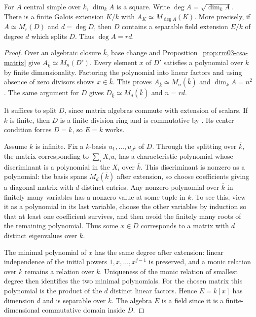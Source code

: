 \begin{theorem}
\label{thm:rm03-csa-galois-split}
For \(A\) central simple over \(k\), \(\dim_k A\) is a square.
Write \(\deg A=\sqrt{\dim_k A}\). There is a finite Galois extension
\(K/k\) with \(A_K\simeq M_{\deg A}(K)\).
More precisely, if \(A\simeq M_r(D)\) and \(d=\deg D\), then \(D\)
contains a separable field extension \(E/k\) of degree \(d\) which
splits \(D\). Thus \(\deg A=rd\).
\end{theorem}
\begin{proof}
Over an algebraic closure \(\overline{k}\), base change and
Proposition~\ref{prop:rm03-csa-matrix} give
\(A_{\overline{k}}\simeq M_n(D')\).
Every element \(x\) of \(D'\) satisfies a polynomial over
\(\overline{k}\) by finite dimensionality. Factoring the polynomial
into linear factors and using absence of zero divisors shows
\(x\in\overline{k}\). This proves \(A_{\overline{k}}\simeq
M_n(\overline{k})\) and \(\dim_k A=n^2\). The same argument for \(D\)
gives \(D_{\overline{k}}\simeq M_d(\overline{k})\) and
\(n=rd\).

It suffices to split \(D\), since matrix algebras commute with
extension of scalars. If \(k\) is finite, then \(D\) is a finite
division ring and is commutative by
\cite[K07.23.finite\_division\_ring]{d07}. Its center condition forces
\(D=k\), so \(E=k\) works.

Assume \(k\) is infinite. Fix a \(k\)-basis \(u_1,\ldots,u_{d^2}\)
of \(D\). Through the splitting over \(\overline{k}\), the matrix
corresponding to \(\sum_i X_i u_i\) has a characteristic polynomial
whose discriminant is a polynomial in the \(X_i\) over
\(\overline{k}\). This discriminant is nonzero as a polynomial:
the basis spans \(M_d(\overline{k})\) after extension, so choose
coefficients giving a diagonal matrix with \(d\) distinct entries.
Any nonzero polynomial over \(\overline{k}\) in finitely many
variables has a nonzero value at some tuple in \(k\). To see this,
view it as a polynomial in its last variable, choose the other
variables by induction so that at least one coefficient survives,
and then avoid the finitely many roots of the remaining polynomial.
Thus some \(x\in D\) corresponds to a matrix with \(d\) distinct
eigenvalues over \(\overline{k}\).

The minimal polynomial of \(x\) has the same degree after extension:
linear independence of the initial powers \(1,x,\ldots,x^{j-1}\)
is preserved, and a monic relation over \(k\) remains a relation
over \(\overline{k}\). Uniqueness of the monic relation of smallest
degree then identifies the two minimal polynomials. For the chosen
matrix this polynomial is the product of the \(d\) distinct linear
factors. Hence \(E=k[x]\) has dimension \(d\) and is separable over \(k\).
The algebra \(E\) is a field since it is a finite-dimensional
commutative domain inside \(D\).


\end{proof}
